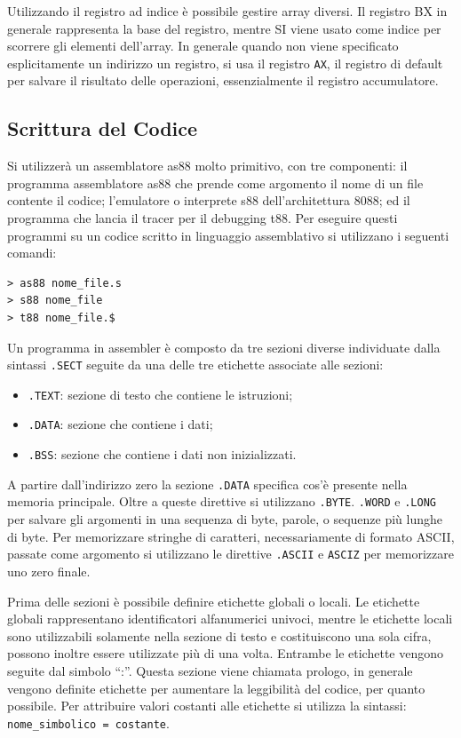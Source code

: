 \documentclass{article}
\numberwithin{equation}{subsection}
\begin{document}
Utilizzando il registro ad indice è possibile gestire array diversi. Il registro BX in generale rappresenta la base del registro, mentre SI viene usato come indice per scorrere gli elementi 
dell'array. 
In generale quando non viene specificato esplicitamente un indirizzo un registro, si usa il registro \verb|AX|, il registro di default per salvare il risultato delle operazioni, essenzialmente il registro 
accumulatore. 

\subsection{Scrittura del Codice}

Si utilizzerà un assemblatore as88 molto primitivo, con tre componenti: il programma assemblatore as88 che prende come argomento il nome di un file contente il codice; 
l'emulatore o interprete s88 dell'architettura 8088; ed il programma che lancia il tracer per il debugging t88. Per eseguire questi programmi su un codice scritto in linguaggio assemblativo si utilizzano 
i seguenti comandi:
\begin{verbatim}
> as88 nome_file.s
> s88 nome_file
> t88 nome_file.$
\end{verbatim}


Un programma in assembler è composto da tre sezioni diverse individuate dalla sintassi \verb|.SECT| seguite da una delle tre etichette associate alle sezioni: 
\begin{itemize}
    \item \verb|.TEXT|: sezione di testo che contiene le istruzioni;
    \item \verb|.DATA|: sezione che contiene i dati;
    \item \verb|.BSS|: sezione che contiene i dati non inizializzati. 
\end{itemize}

A partire dall'indirizzo zero la sezione \verb|.DATA| specifica cos'è presente nella memoria principale. 
Oltre a queste direttive si utilizzano \verb|.BYTE|. \verb|.WORD| e \verb|.LONG| per salvare gli argomenti in una sequenza di byte, parole, o sequenze più lunghe di byte. Per memorizzare stringhe di caratteri, 
necessariamente di formato ASCII, passate come argomento si utilizzano le direttive \verb|.ASCII| e \verb|ASCIZ| per memorizzare uno zero finale. 


Prima delle sezioni è possibile definire etichette globali o locali. Le etichette globali rappresentano identificatori alfanumerici univoci, mentre le etichette locali sono utilizzabili solamente nella sezione di 
testo e costituiscono una sola cifra, possono inoltre essere utilizzate più di una volta. Entrambe le etichette vengono seguite dal simbolo ``:''. 
Questa sezione viene chiamata prologo, in generale vengono definite etichette per aumentare la leggibilità del codice, per quanto possibile. 
Per attribuire valori costanti alle etichette si utilizza la sintassi: \verb|nome_simbolico = costante|. 
\end{document}
